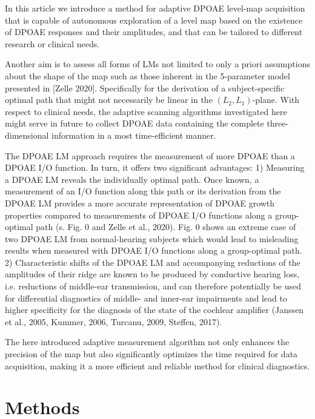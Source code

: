 \documentclass[journal,twoside,web]{ieeecolor2}
\begin{document}
In this article we introduce a method for adaptive DPOAE level-map acquisition that is capable of autonomous exploration of a level map based on the existence of DPOAE responses and their amplitudes, and that can be tailored to different research or clinical needs. 

Another aim is to assess all forms of LMs not limited to only a priori assumptions about the shape of the map such as those inherent in the 5-parameter model presented in [Zelle 2020]. Specifically for the derivation of a subject-specific optimal path that might not necessarily be linear in the  $(L_2, L_1)$-plane. With respect to clinical needs, the adaptive scanning algorithms investigated here might serve in future to collect DPOAE data containing the complete three-dimensional information in a most time-efficient manner.

The DPOAE LM approach requires the measurement of more DPOAE than a DPOAE I/O function. In turn, it offers two significant advantages: 1) Measuring a DPOAE LM reveals the individually optimal path. Once known, a measurement of an I/O function along this path or its derivation from the DPOAE LM provides a more accurate representation of DPOAE growth properties compared to measurements of DPOAE I/O functions along a group-optimal path (s. Fig. 0 and Zelle et al., 2020).  Fig. 0 shows an extreme case of two DPOAE LM from normal-hearing subjects which would lead to misleading results when measured with DPOAE I/O functions along a group-optimal path. 2) Characteristic shifts of the DPOAE LM and accompanying reductions of the amplitudes of their ridge are known to be produced by conductive hearing loss, i.e. reductions of middle-ear transmission, and can therefore potentially be used for differential diagnostics of middle- and inner-ear impairments and lead to higher specificity for the diagnosis of the state of the cochlear amplifier (Janssen et al., 2005, Kummer, 2006, Turcanu, 2009, Steffen, 2017). 

The here introduced adaptive measurement algorithm not only enhances the precision of the map but also significantly optimizes the time required for data acquisition, making it a more efficient and reliable method for clinical diagnostics.

\section{Methods}
\end{document}
